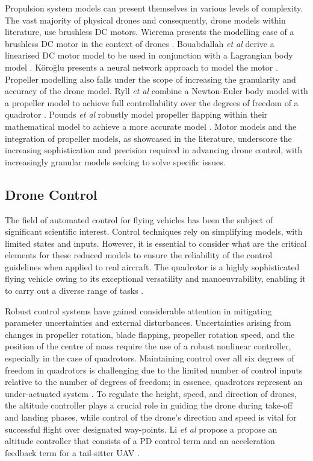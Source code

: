 Propulsion system models can present themselves in various levels of complexity. The vast majority of physical drones and consequently, drone models within literature, use brushless DC motors.  Wierema presents the modelling case of a brushless DC motor in the context of drones \cite{hd6}. Bouabdallah \textit{et al} derive a linearised DC motor model to be used in conjunction with a Lagrangian body model \cite{hd7}. Köroğlu presents a neural network approach to model the motor \cite{hd8}. Propeller modelling also falls under the scope of increasing the granularity and accuracy of the drone model. %
Ryll \textit{et al} combine a Newton-Euler body model with a propeller model to achieve full controllability over the degrees of freedom of a quadrotor \cite{hd9}. Pounds \textit{et al} robustly model propeller flapping within their mathematical model to achieve a more accurate model \cite{hd10}. Motor models and the integration of propeller models, as showcased in the literature, underscore the increasing sophistication and precision required in advancing drone control, with increasingly granular models seeking to solve specific issues. 
\subsection{Drone Control}
The field of automated control for flying vehicles has been the subject of significant scientific interest. Control techniques rely on simplifying models, with limited states and inputs. However, it is essential to consider what are the critical elements for these reduced models to ensure the reliability of the control guidelines when applied to real aircraft. The quadrotor is a highly sophisticated flying vehicle owing to its exceptional versatility and manoeuvrability, enabling it to carry out a diverse range of tasks \cite{li6}. 

Robust control systems have gained considerable attention in mitigating parameter uncertainties and external disturbances. Uncertainties arising from changes in propeller rotation, blade flapping, propeller rotation speed, and the position of the centre of mass require the use of a robust nonlinear controller, especially in the case of quadrotors. Maintaining control over all six degrees of freedom in quadrotors is challenging due to the limited number of control inputs relative to the number of degrees of freedom; in essence, quadrotors represent an under-actuated system \cite{EMRAN2018165}. To regulate the height, speed, and direction of drones, the altitude controller plays a crucial role in guiding the drone during take-off and landing phases, while control of the drone's direction and speed is vital for successful flight over designated way-points. Li \textit{et al} propose a propose an altitude controller that consists of a PD control term and an acceleration feedback term for a tail-sitter UAV \cite{li7}. 

